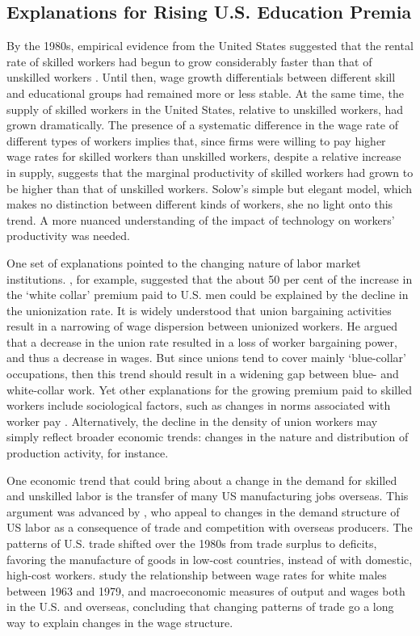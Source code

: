 \subsection{Explanations for Rising U.S. Education Premia}

By the 1980s, empirical evidence from the United States suggested that the rental rate of skilled workers had begun to grow considerably faster than that of unskilled workers \citep{Juhn1993}. Until then, wage growth differentials between different skill and educational groups had remained more or less stable. At the same time, the supply of skilled workers in the United States, relative to unskilled workers, had grown dramatically. The presence of a systematic difference in the wage rate of different types of workers implies that, since firms were willing to pay higher wage rates for skilled workers than unskilled workers, despite a relative increase in supply, suggests that the marginal productivity of skilled workers had grown to be higher than that of unskilled workers. Solow's simple but elegant model, which makes no distinction between different kinds of workers, she no light onto this trend. A more nuanced understanding of the impact of technology on workers' productivity was needed.

One set of explanations pointed to the changing nature of labor market institutions. \citet{Freeman1994}, for example, suggested that the about 50 per cent of the increase in the `white collar' premium paid to U.S. men could be explained by the decline in the unionization rate. It is widely understood that union bargaining activities result in a narrowing of wage dispersion between unionized workers. He argued that a decrease in the union rate resulted in a loss of worker bargaining power, and thus a decrease in wages. But since unions tend to cover mainly `blue-collar' occupations, then this trend should result in a widening gap between blue- and white-collar work. Yet other explanations for the growing premium paid to skilled workers include sociological factors, such as changes in norms associated with worker pay \citep{Mitchell1989}. Alternatively, the decline in the density of union workers may simply reflect broader economic trends: changes in the nature and distribution of production activity, for instance.

One economic trend that could bring about a change in the demand for skilled and unskilled labor is the transfer of many US manufacturing jobs overseas. This argument was advanced by \citet{Murphy1992}, who appeal to changes in the demand structure of US labor as a consequence of trade and competition with overseas producers. The patterns of U.S. trade shifted over the 1980s from trade surplus to deficits, favoring the manufacture of goods in low-cost countries, instead of with domestic, high-cost workers.  study the relationship between wage rates for white males between 1963 and 1979, and macroeconomic measures of output and wages both in the U.S. and overseas, concluding that changing patterns of trade go a long way to explain changes in the wage structure.

